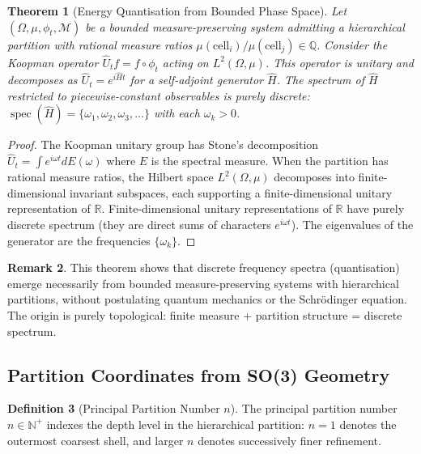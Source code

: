 \documentclass[11pt,twocolumn,a4paper]{article}
\newtheorem{theorem}{Theorem}[section]
\theoremstyle{definition}
\newtheorem{definition}[theorem]{Definition}
\newtheorem{remark}[theorem]{Remark}
\DeclareMathOperator{\spec}{spec}
\newcommand{\calM}{\mathcal{M}}
\begin{document}
\begin{theorem}[Energy Quantisation from Bounded Phase Space]
\label{thm:quantisation}
Let $(\Omega, \mu, \phi_t, \calM)$ be a bounded measure-preserving system admitting a hierarchical partition with rational measure ratios $\mu(\text{cell}_i)/\mu(\text{cell}_j) \in \mathbb{Q}$. Consider the Koopman operator $\hat{U}_t f = f \circ \phi_t$ acting on $L^2(\Omega, \mu)$. This operator is unitary and decomposes as $\hat{U}_t = e^{i\hat{H}t}$ for a self-adjoint generator $\hat{H}$. The spectrum of $\hat{H}$ restricted to piecewise-constant observables is purely discrete: $\spec(\hat{H}) = \{\omega_1, \omega_2, \omega_3, \ldots\}$ with each $\omega_k > 0$.
\end{theorem}

\begin{proof}
The Koopman unitary group has Stone's decomposition $\hat{U}_t = \int e^{i\omega t} dE(\omega)$ where $E$ is the spectral measure. When the partition has rational measure ratios, the Hilbert space $L^2(\Omega,\mu)$ decomposes into finite-dimensional invariant subspaces, each supporting a finite-dimensional unitary representation of $\mathbb{R}$. Finite-dimensional unitary representations of $\mathbb{R}$ have purely discrete spectrum (they are direct sums of characters $e^{i\omega t}$). The eigenvalues of the generator are the frequencies $\{\omega_k\}$.
\end{proof}

\begin{remark}
This theorem shows that discrete frequency spectra (quantisation) emerge necessarily from bounded measure-preserving systems with hierarchical partitions, without postulating quantum mechanics or the Schrödinger equation. The origin is purely topological: finite measure + partition structure = discrete spectrum.
\end{remark}

\subsection{Partition Coordinates from SO(3) Geometry}

\begin{definition}[Principal Partition Number $n$]
The principal partition number $n \in \mathbb{N}^+$ indexes the depth level in the hierarchical partition: $n=1$ denotes the outermost coarsest shell, and larger $n$ denotes successively finer refinement.
\end{definition}
\end{document}
